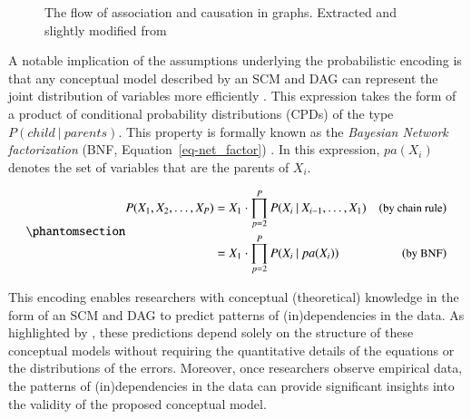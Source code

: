 \documentclass[
  authoryear,
  review,
  1p]{elsarticle}
\begin{document}
\begin{figure}


\caption{\label{fig-ACflow}The flow of association and causation in
graphs. Extracted and slightly modified from \citet[pp.~31]{Neal_2020}}

\end{figure}%

A notable implication of the assumptions underlying the probabilistic
encoding is that any conceptual model described by an SCM and DAG can
represent the joint distribution of variables more efficiently
\citep[pp.~29]{Pearl_et_al_2016}. This expression takes the form of a
product of conditional probability distributions (CPDs) of the type
\(P(child \:|\:parents)\). This property is formally known as the
\emph{Bayesian Network factorization} (BNF,
Equation~\ref{eq-net_factor})
\citetext{\citealp[pp.~29]{Pearl_et_al_2016}; \citealp[pp.~21]{Neal_2020}}.
In this expression, \(pa(X_{i})\) denotes the set of variables that are
the parents of \(X_{i}\).

\begin{equation}\phantomsection\label{eq-net_factor}{
\begin{aligned}
P(X_{1}, X_{2}, \dots, X_{P}) & = X_{1} \cdot \prod^{P}_{p=2} P(X_{i} \:|\:X_{i-1}, \dots, X_{1}) & (\small{\text{by chain rule})}\\
& = X_{1} \cdot \prod^{P}_{p=2} P(X_{i} \:|\:pa(X_{i}) ) & (\small{\text{by BNF}})
\end{aligned}
}\end{equation}

This encoding enables researchers with conceptual (theoretical)
knowledge in the form of an SCM and DAG to predict patterns of
(in)dependencies in the data. As highlighted by
\citet[pp.~35]{Pearl_et_al_2016}, these predictions depend solely on the
structure of these conceptual models without requiring the quantitative
details of the equations or the distributions of the errors. Moreover,
once researchers observe empirical data, the patterns of
(in)dependencies in the data can provide significant insights into the
validity of the proposed conceptual model.
\end{document}
